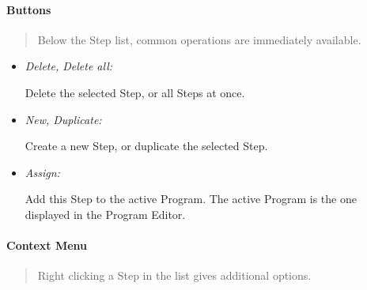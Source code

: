 \hypertarget{buttons}{%
\paragraph{Buttons}\label{buttons}}

\begin{quote}
Below the Step list, common operations are immediately available.
\end{quote}

\begin{itemize}
\item
  \emph{Delete, Delete all:}

  Delete the selected Step, or all Steps at once.
\item
  \emph{New, Duplicate:}

  Create a new Step, or duplicate the selected Step.
\item
  \emph{Assign:}

  Add this Step to the active Program. The active Program is the one
  displayed in the Program Editor.
\end{itemize}

\hypertarget{context-menu}{%
\paragraph{Context Menu}\label{context-menu}}

\begin{quote}
Right clicking a Step in the list gives additional options.
\end{quote}

